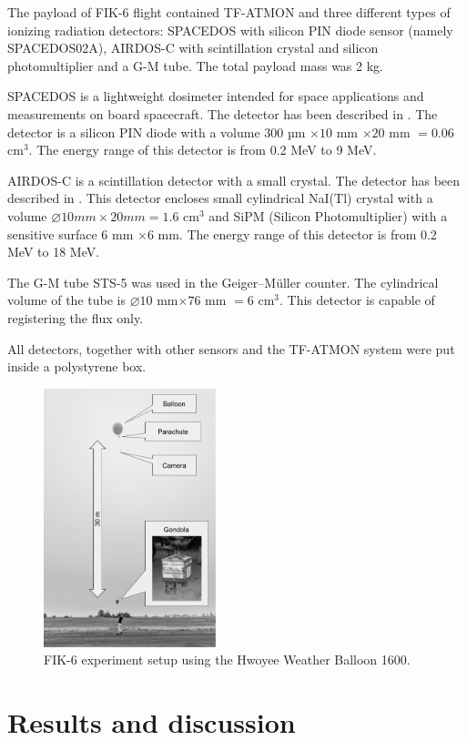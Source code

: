 \documentclass{Rpd}
\begin{document}
The payload of FIK-6 flight contained TF-ATMON and three different types of ionizing radiation detectors: SPACEDOS with silicon PIN diode sensor (namely SPACEDOS02A), AIRDOS-C with scintillation crystal and silicon photomultiplier and a G-M tube. The total payload mass was 2 kg.

SPACEDOS is a lightweight dosimeter intended for space applications and measurements on board spacecraft. The detector has been described in \cite{SPACEDOS}. The detector is a silicon PIN diode with a volume $300$ µm $\times 10$ mm $\times 20$ mm $= 0.06$ cm$^3$. The energy range of this detector is from 0.2 MeV to 9 MeV.

AIRDOS-C is a scintillation detector with a small crystal. The detector has been described in \cite{AIRDOS-C}. This detector encloses small cylindrical NaI(Tl) crystal with a volume $\diameter 10 mm \times 20 mm = 1.6$ cm$^3$ and SiPM (Silicon Photomultiplier) with a sensitive surface $6$ mm $\times 6$ mm. The energy range of this detector is from 0.2 MeV to 18 MeV.

The G-M tube STS-5 was used in the Geiger–Müller counter. The cylindrical volume of the tube is $\diameter 10$ mm$ \times 76$ mm $= 6$ cm$^3$. This detector is capable of registering the flux only. 

All detectors, together with other sensors and the TF-ATMON system were put inside a polystyrene box. 

\begin{figure}%
	\centerline{\includegraphics[width=50mm]{img/FIK-6_experiment_setup.png}}
	\caption{FIK-6 experiment setup using the Hwoyee Weather Balloon 1600. \label{FIK-6_setup}}
\end{figure}


\section{Results and discussion}
\end{document}

